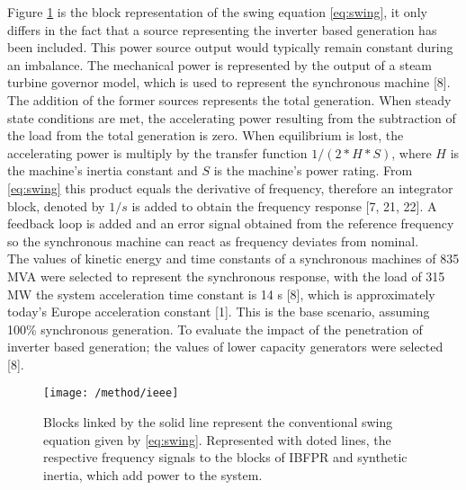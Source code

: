 Figure \ref{fig:ieeesimple} is the block representation of the swing equation \eqref{eq:swing}, it only differs in the fact that a source representing the inverter based generation has been included. This power source output would typically remain constant during an imbalance. The mechanical power is represented by the output of a steam turbine governor model, which is used to represent the synchronous machine [8]. The addition of the former sources represents the total generation. When steady state conditions are met, the accelerating power resulting from the subtraction of the load from the total generation is zero. When equilibrium is lost, the accelerating power is multiply by the transfer function $ 1/(2*H*S) $, where $ H $ is the machine’s inertia constant and $ S $ is the machine’s power rating. From \ref{eq:swing} this product equals the derivative of frequency, therefore an integrator block, denoted by $ 1/s $ is added to obtain the frequency response [7, 21, 22]. A feedback loop is added and an error signal obtained from the reference frequency so the synchronous machine can react as frequency deviates from nominal. \\ %
The values of kinetic energy and time constants of a synchronous machines of 835 MVA were selected to represent the synchronous response, with the load of 315 MW the system acceleration time constant is 14 s [8], which is approximately today’s Europe acceleration constant [1]. This is the base scenario, assuming 100\% synchronous generation. To evaluate the impact of the penetration of inverter based generation; the values of lower capacity generators were selected [8].\\%

\begin{figure}[h]
	\centering
	\texttt{[image: /method/ieee]}
	\caption{Blocks linked by the solid line represent the conventional swing equation given by \eqref{eq:swing}. Represented with doted lines, the respective frequency signals to the blocks of IBFPR and synthetic inertia, which add power to the system.}
	\label{fig:ieeesimple}
\end{figure}




